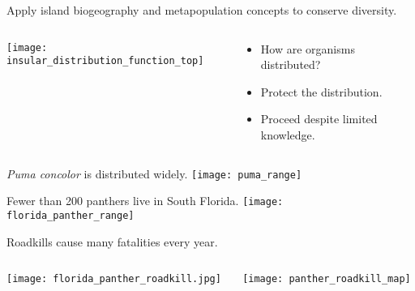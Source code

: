 \documentclass[t]{beamer}
\begin{document}
\begin{frame}[plain]{Apply island biogeography and metapopulation concepts to conserve diversity.}
	\begin{columns}[T]
		\begin{column}{0.6\textwidth}%
			\centering
			\texttt{[image: insular\_distribution\_function\_top]}\\
		\end{column}
		\begin{column}{0.4\textwidth}%
			\begin{itemize}%
				\item How are organisms distributed?
				\item Protect the distribution.
				\item Proceed despite limited knowledge.
			\end{itemize}
		\end{column}		
	\end{columns}
\end{frame}

{
\begin{frame}[plain]
\end{frame}
}

\begin{frame}[plain]{\textit{Puma concolor} is distributed widely.}
	\centering%
		\texttt{[image: puma\_range]}
\end{frame}

\begin{frame}[plain]{Fewer than 200 panthers live in South Florida.}
	\centering%
		\texttt{[image: florida\_panther\_range]}
\end{frame}

\begin{frame}[plain]{Roadkills cause many fatalities every year.}
	\begin{columns}[T]%
		\begin{column}{0.4\textwidth}%
			\centering%
			\texttt{[image: florida\_panther\_roadkill.jpg]}
		\end{column}
		\begin{column}{0.55\textwidth}%
			\centering%
			\texttt{[image: panther\_roadkill\_map]}
		\end{column}
	\end{columns}
\end{frame}
\end{document}
